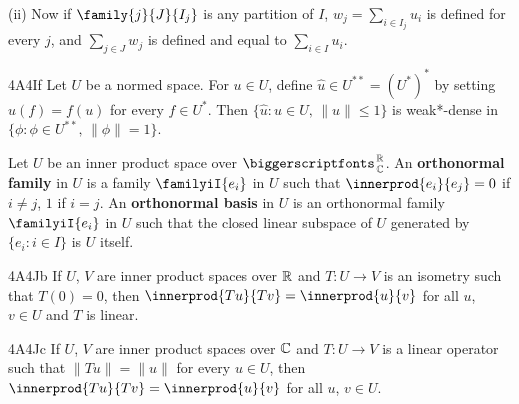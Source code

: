 \quad(ii) Now if $\family{j}{J}{I_j}$ is any partition of $I$,
$w_j=\sum_{i\in I_j}u_i$ is defined for every $j$, and
$\sum_{j\in J}w_j$ is defined and equal to $\sum_{i\in I}u_i$.

\spheader 4A4If Let $U$ be a normed space.   For $u\in U$, define
$\hat u\in U^{**}=(U^*)^*$ by setting $\hat u(f)=f(u)$ for every
$f\in U^*$.   Then $\{\hat u:u\in U,\,\|u\|\le 1\}$ is weak*-dense in
$\{\phi:\phi\in U^{**},\,\|\phi\|=1\}$.   

Let $U$ be an inner product space over
$\RoverC$.
An {\bf orthonormal family} in $U$ is a family $\familyiI{e_i}$ in $U$
such that $\innerprod{e_i}{e_j}=0$ if $i\ne j$, $1$ if $i=j$.
An {\bf orthonormal basis} in $U$ is an orthonormal family
$\familyiI{e_i}$ in $U$ such that the closed
linear subspace of $U$ generated by $\{e_i:i\in I\}$ is $U$ itself.

\spheader 4A4Jb If $U$, $V$ are inner product spaces over $\Bbb R$
and $T:U\to V$ is an isometry such that $T(0)=0$, then
$\innerprod{Tu}{Tv}=\innerprod{u}{v}$ for all $u$, $v\in U$ and $T$ is
linear.   

\spheader 4A4Jc If $U$, $V$ are inner product spaces over $\Bbb C$ and
$T:U\to V$ is a linear operator such that $\|Tu\|=\|u\|$ for every
$u\in U$, then $\innerprod{Tu}{Tv}=\innerprod{u}{v}$ for all $u$, $v\in U$.


